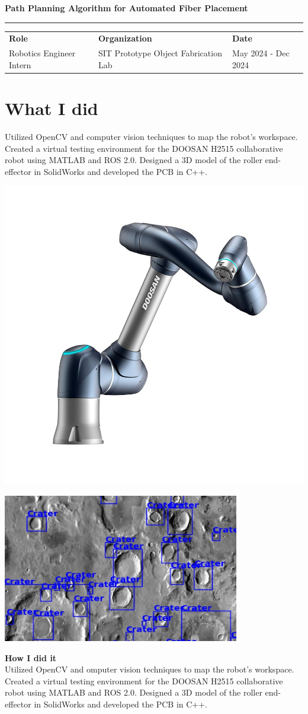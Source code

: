 \documentclass[a4paper]{article}
\begin{document}
\thispagestyle{empty}

\begin{center}
    {\Large \textbf{Path Planning Algorithm for Automated Fiber Placement}}\\[0.1em]
    \hfill
\end{center}


\vspace{1em}
\hrule
\vspace{1em}


\begin{tabularx}{\textwidth}{>{\centering\arraybackslash}X>{\centering\arraybackslash}X>{\centering\arraybackslash}X}
    \textbf{Role} & \textbf{Organization} & \textbf{Date} \\
    Robotics Engineer Intern & SIT Prototype Object Fabrication Lab & May 2024 - Dec 2024 
\end{tabularx}

\section*{What I did}

\noindent
\parbox[b]{.6\textwidth}{
    Utilized OpenCV and computer vision techniques to map the robot's workspace.
    Created a virtual testing environment for the DOOSAN H2515 collaborative robot using MATLAB and ROS 2.0.
    Designed a 3D model of the roller end-effector in SolidWorks and developed the PCB in C++.

}
\includegraphics[width=.4\textwidth]{images/doosan-logo.jpg}%


\noindent

\includegraphics[width=.4\textwidth]{images/img-processing.png}
\parbox[b]{.6\textwidth}{
    \textbf{How I did it} \\
    Utilized OpenCV and omputer vision techniques to map the robot's workspace.
    Created a virtual testing environment for the DOOSAN H2515 collaborative robot using MATLAB and ROS 2.0.
    Designed a 3D model of the roller end-effector in SolidWorks and developed the PCB in C++.

}
\end{document}
